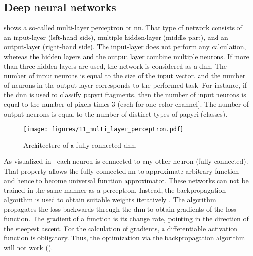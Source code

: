 \subsection{Deep neural networks}
 shows a so-called multi-layer perceptron or \ac{nn}. That type of network consists of an input-layer (left-hand side), multiple hidden-layer (middle part), and an output-layer (right-hand side). The input-layer does not perform any calculation, whereas the hidden layers and the output layer combine multiple neurons. If more than three hidden-layers are used, the network is considered as a \ac{dnn}. The number of input neurons is equal to the size of the input vector, and the number of neurons in the output layer corresponds to the performed task. For instance, if the \ac{dnn} is used to classify papyri fragments, then the number of input neurons is equal to the number of pixels times 3 (each for one color channel). The number of output neurons is equal to the number of distinct types of papyri (classes).\\

\begin{figure}[t]
	\texttt{[image: figures/11\_multi\_layer\_perceptron.pdf]}
	\caption{Architecture of a fully connected \ac{dnn}.}
	\label{fig:MLP}
\end{figure}
%
\noindent As visualized in , each neuron is connected to any other neuron (fully connected). That property allows the fully connected \ac{nn} to approximate arbitrary function and hence to become universal function approximator. These networks can not be trained in the same manner as a perceptron. Instead, the backpropagation algorithm is used to obtain suitable weights iteratively \cite{Rumelhart86}. The algorithm propagates the loss backwards through the \ac{dnn} to obtain gradients of the loss function. The gradient of a function is its change rate, pointing in the direction of the steepest ascent. For the calculation of gradients, a differentiable activation function is obligatory. Thus, the optimization via the backpropagation algorithm will not work ().
%
